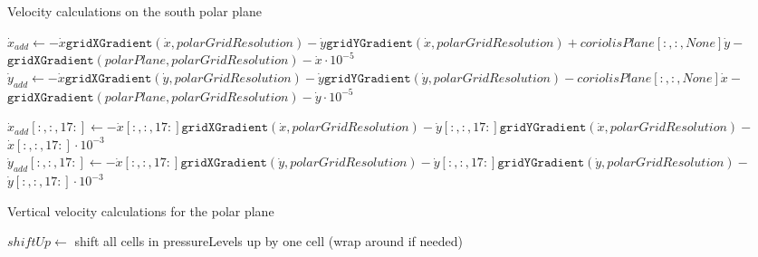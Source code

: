 \begin{algorithm}[htb]
    \caption{Velocity calculations on the south polar plane}
    \label{alg:polar velocity south vectorised}
    $\dot{x}_{add} \leftarrow - \dot{x} \texttt{gridXGradient}(\dot{x}, polarGridResolution) - \dot{y} \texttt{gridYGradient}(\dot{x}, polarGridResolution) + coriolisPlane[:, :, None] \dot{y} -$ 
        $\texttt{gridXGradient}(polarPlane, polarGridResolution) - \dot{x} \cdot 10^{-5}$ \;
    $\dot{y}_{add} \leftarrow - \dot{x} \texttt{gridXGradient}(\dot{y}, polarGridResolution) - \dot{y} \texttt{gridYGradient}(\dot{y}, polarGridResolution) - coriolisPlane[:, :, None] \dot{x} -$ 
        $\texttt{gridXGradient}(polarPlane, polarGridResolution) - \dot{y} \cdot 10^{-5}$ \;

    $\dot{x}_{add}[:,:,17:] \leftarrow - \dot{x}[:,:,17:] \texttt{gridXGradient}(\dot{x}, polarGridResolution) - \dot{y}[:,:,17:] \texttt{gridYGradient}(\dot{x}, polarGridResolution) - $ 
        $\dot{x}[:,:,17:] \cdot 10^{-3}$ \; 
    $\dot{y}_{add}[:,:,17:] \leftarrow - \dot{x}[:,:,17:] \texttt{gridXGradient}(\dot{y}, polarGridResolution) - \dot{y}[:,:,17:] \texttt{gridYGradient}(\dot{y}, polarGridResolution) -$
        $\dot{y}[:,:,17:] \cdot 10^{-3}$ \; 


\end{algorithm}

\begin{algorithm}[htb]
    \caption{Vertical velocity calculations for the polar plane}
    \label{alg:polar velocity vert vectorised}
    $shiftUp \leftarrow$ shift all cells in pressureLevels up by one cell (wrap around if needed) \;
\end{algorithm}